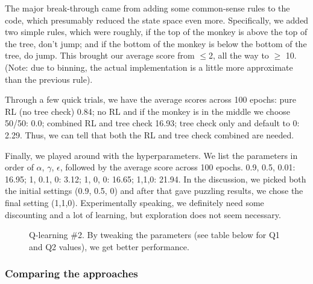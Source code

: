 \documentclass[11pt]{article}
\begin{document}
The major break-through came from adding some common-sense rules to the code, which presumably reduced the state space even more. Specifically, we added two simple rules, which were roughly, if the top of the monkey is above the top of the tree, don't jump; and if the bottom of the monkey is below the bottom of the tree, do jump. This brought our average score from $\leq$2, all the way to $\geq$ 10. (Note: due to binning, the actual implementation is a little more approximate than the previous rule). 

Through a few quick trials, we have the average scores across 100 epochs: pure RL (no tree check) 0.84; no RL and if the monkey is in the middle we choose 50/50: 0.0; combined RL and tree check 16.93; tree check only and default to 0: 2.29. Thus, we can tell that both the RL and tree check combined are needed.

Finally, we played around with the hyperparameters. We list the parameters in order of $\alpha$, $\gamma$, $\epsilon$, followed by the average score across 100 epochs.
0.9, 0.5, 0.01: 16.95; 1, 0.1, 0: 3.12; 1, 0, 0: 16.65; 1,1,0: 21.94.
In the discussion, we picked both the initial settings (0.9, 0.5, 0) and after that gave puzzling results, we chose the final setting (1,1,0). Experimentally speaking, we definitely need some discounting and a lot of learning, but exploration does not seem necessary.

\begin{figure}%
\centering
{}%
\qquad
{}%
  \caption{Q-learning \#2. By tweaking the parameters (see table below for Q1 and Q2 values), we get better performance.}
\end{figure}


\subsubsection{Comparing the approaches}
\end{document}
